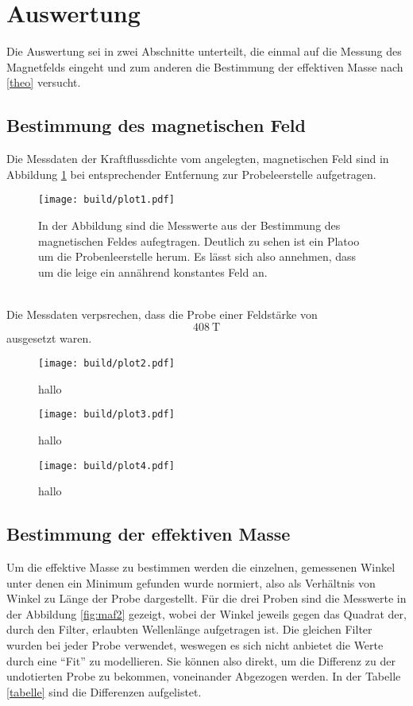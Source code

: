 \newpage
\section{Auswertung}
Die Auswertung sei in zwei Abschnitte unterteilt, die einmal auf die Messung des Magnetfelds eingeht und zum 
anderen die Bestimmung der effektiven Masse nach \ref{theo} versucht. 
\subsection{Bestimmung des magnetischen Feld}
Die Messdaten der Kraftflussdichte vom angelegten, magnetischen Feld sind in Abbildung \ref{fig:mag}
bei entsprechender Entfernung zur Probeleerstelle aufgetragen.
\begin{figure}
    \centering
    \texttt{[image: build/plot1.pdf]}
    \caption{In der Abbildung sind die Messwerte aus der Bestimmung des magnetischen Feldes aufegtragen. 
            Deutlich zu sehen ist ein Platoo um die Probenleerstelle herum. Es lässt sich also annehmen, dass
            um die leige ein annährend konstantes Feld an.}
    \label{fig:mag}
\end{figure}
\\
Die Messdaten verpsrechen, dass die Probe einer Feldstärke von 
\begin{equation}
    \SI{408}{\tesla}
\end{equation}
ausgesetzt waren.
\begin{figure}
    \centering
    \texttt{[image: build/plot2.pdf]}
    \caption{hallo}
    \label{maf2}
\end{figure}

\begin{figure}
    \centering
    \texttt{[image: build/plot3.pdf]}
    \caption{hallo}
\end{figure}

\begin{figure}
    \centering
    \texttt{[image: build/plot4.pdf]}
    \caption{hallo}
\end{figure}


\subsection{Bestimmung der effektiven Masse}
Um die effektive Masse zu bestimmen werden die einzelnen, gemessenen Winkel unter denen ein Minimum gefunden wurde
normiert, also als Verhältnis von Winkel zu Länge der Probe dargestellt.
Für die drei Proben sind die Messwerte in der Abbildung \ref{fig:maf2} gezeigt, wobei der Winkel 
jeweils gegen das Quadrat der, durch den Filter, erlaubten Wellenlänge aufgetragen ist.
Die gleichen Filter wurden bei jeder Probe verwendet, weswegen es sich nicht anbietet die Werte durch eine \enquote{Fit} zu modellieren.
Sie können also direkt, um die Differenz zu der undotierten Probe zu bekommen, voneinander Abgezogen werden.
In der Tabelle \ref{tabelle} sind die Differenzen aufgelistet.
